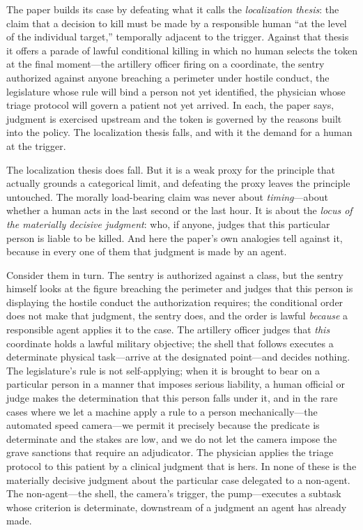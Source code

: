 \documentclass[11pt]{article}
\begin{document}
The paper builds its case by defeating what it calls the \emph{localization thesis}: the claim that a decision to kill must be made by a responsible human ``at the level of the individual target,'' temporally adjacent to the trigger. Against that thesis it offers a parade of lawful conditional killing in which no human selects the token at the final moment---the artillery officer firing on a coordinate, the sentry authorized against anyone breaching a perimeter under hostile conduct, the legislature whose rule will bind a person not yet identified, the physician whose triage protocol will govern a patient not yet arrived. In each, the paper says, judgment is exercised upstream and the token is governed by the reasons built into the policy. The localization thesis falls, and with it the demand for a human at the trigger.

The localization thesis does fall. But it is a weak proxy for the principle that actually grounds a categorical limit, and defeating the proxy leaves the principle untouched. The morally load-bearing claim was never about \emph{timing}---about whether a human acts in the last second or the last hour. It is about the \emph{locus of the materially decisive judgment}: who, if anyone, judges that this particular person is liable to be killed. And here the paper's own analogies tell against it, because in every one of them that judgment is made by an agent.

Consider them in turn. The sentry is authorized against a class, but the sentry himself looks at the figure breaching the perimeter and judges that this person is displaying the hostile conduct the authorization requires; the conditional order does not make that judgment, the sentry does, and the order is lawful \emph{because} a responsible agent applies it to the case. The artillery officer judges that \emph{this} coordinate holds a lawful military objective; the shell that follows executes a determinate physical task---arrive at the designated point---and decides nothing. The legislature's rule is not self-applying; when it is brought to bear on a particular person in a manner that imposes serious liability, a human official or judge makes the determination that this person falls under it, and in the rare cases where we let a machine apply a rule to a person mechanically---the automated speed camera---we permit it precisely because the predicate is determinate and the stakes are low, and we do not let the camera impose the grave sanctions that require an adjudicator. The physician applies the triage protocol to this patient by a clinical judgment that is hers. In none of these is the materially decisive judgment about the particular case delegated to a non-agent. The non-agent---the shell, the camera's trigger, the pump---executes a subtask whose criterion is determinate, downstream of a judgment an agent has already made.
\end{document}
